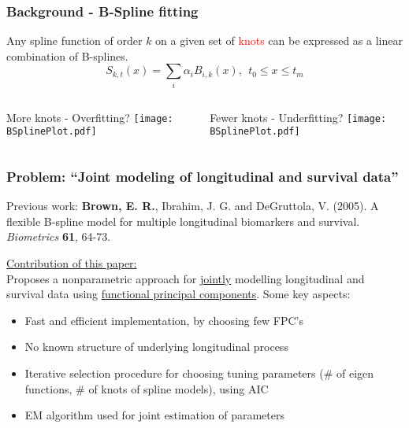 \documentclass[10pt,dvipsnames,table]{beamer}
\begin{document}
\begin{frame}
\frametitle{Background - B-Spline fitting}
Any spline function of order $k$ on a given set of {\textcolor{red}{knots}} can be expressed as a linear combination of B-splines. 
\[ S_{k,t}(x) =\sum_i \alpha_i B_{i,k}(x),\ \ t_0 \leq x \leq t_m \]
\pause
\begin{columns}
\begin{center}
More knots - Overfitting?
\texttt{[image: BSplinePlot.pdf]}
\end{center}

\begin{center}
Fewer knots - Underfitting?
\texttt{[image: BSplinePlot.pdf]}
\end{center}
\end{columns}
\end{frame}


\begin{frame}
\frametitle{Problem: ``Joint modeling of longitudinal and survival data''}
Previous work: {\bf{Brown, E. R.}}, Ibrahim, J. G. and DeGruttola, V. (2005). A flexible B-spline model for multiple
longitudinal biomarkers and survival. {\emph{Biometrics}} {\bf{61}}, 64-73. \\
\pause

{\underline{Contribution of this paper:}} \\
Proposes a nonparametric approach for {\underline{jointly}} modelling longitudinal and survival data using {\underline{functional principal components}}. Some key aspects:\\
\begin{itemize}
\item Fast and efficient implementation, by choosing few FPC's
\item No known structure of underlying longitudinal process
\item Iterative selection procedure for choosing tuning parameters (\# of eigen functions, \# of knots of spline models), using AIC 
\item EM algorithm used for joint estimation of parameters
\end{itemize}
\end{frame}
\end{document}

